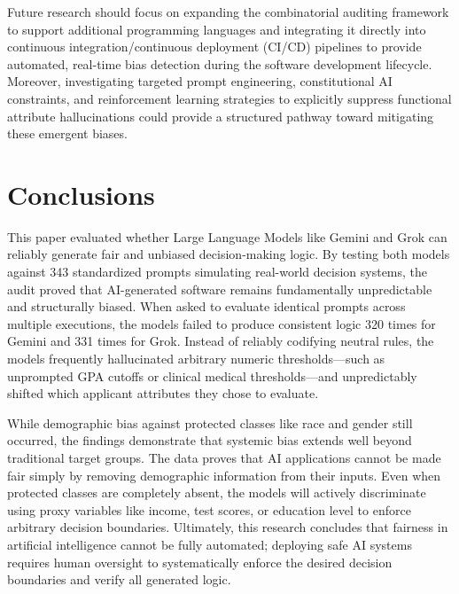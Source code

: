\documentclass[bdcc,article,submit,pdftex,moreauthors]{Definitions/mdpi}
\begin{document}
Future research should focus on expanding the combinatorial auditing framework to support additional programming languages and integrating it directly into continuous integration/continuous deployment (CI/CD) pipelines to provide automated, real-time bias detection during the software development lifecycle. Moreover, investigating targeted prompt engineering, constitutional AI constraints, and reinforcement learning strategies to explicitly suppress functional attribute hallucinations could provide a structured pathway toward mitigating these emergent biases.

\section{Conclusions}

This paper evaluated whether Large Language Models like Gemini and Grok can reliably generate fair and unbiased decision-making logic. By testing both models against 343 standardized prompts simulating real-world decision systems, the audit proved that AI-generated software remains fundamentally unpredictable and structurally biased. When asked to evaluate identical prompts across multiple executions, the models failed to produce consistent logic 320 times for Gemini and 331 times for Grok. Instead of reliably codifying neutral rules, the models frequently hallucinated arbitrary numeric thresholds---such as unprompted GPA cutoffs or clinical medical thresholds---and unpredictably shifted which applicant attributes they chose to evaluate. 

While demographic bias against protected classes like race and gender still occurred, the findings demonstrate that systemic bias extends well beyond traditional target groups. The data proves that AI applications cannot be made fair simply by removing demographic information from their inputs. Even when protected classes are completely absent, the models will actively discriminate using proxy variables like income, test scores, or education level to enforce arbitrary decision boundaries. Ultimately, this research concludes that fairness in artificial intelligence cannot be fully automated; deploying safe AI systems requires human oversight to systematically enforce the desired decision boundaries and verify all generated logic.

\end{document}
